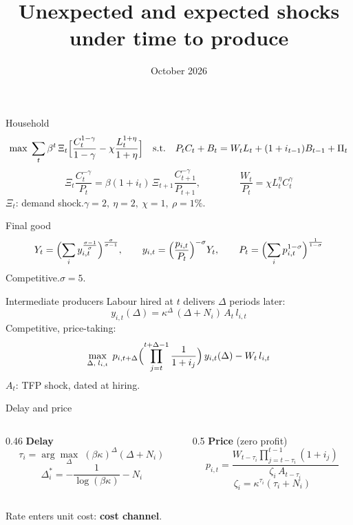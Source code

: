 \documentclass[aspectratio=169,11pt]{beamer}
\title{Unexpected and expected shocks\\[0.2em]under time to produce}
\date{October 2026}
\newcommand{\hl}[1]{{\color{mblue}\textbf{#1}}}
\begin{document}
\begin{frame}[plain]
  \vspace{2.2em}
  \titlepage
\end{frame}

\begin{frame}{Household}
  \[
    \max\;\sum_{t}\beta^t\,\Xi_t\Bigl[\frac{C_t^{1-\gamma}}{1-\gamma}
      -\chi\frac{L_t^{1+\eta}}{1+\eta}\Bigr]
    \quad\text{s.t.}\quad
    P_tC_t+B_t=W_tL_t+(1+i_{t-1})B_{t-1}+\Pi_t
  \]
  \[
    \Xi_t\frac{C_t^{-\gamma}}{P_t}=\beta(1+i_t)\,\Xi_{t+1}\frac{C_{t+1}^{-\gamma}}{P_{t+1}},
    \qquad\qquad
    \frac{W_t}{P_t}=\chi L_t^{\eta}C_t^{\gamma}
  \]
  \medskip
  $\Xi_t$: demand shock.\quad $\gamma=2,\ \eta=2,\ \chi=1,\ \rho=1\%$.
\end{frame}

\begin{frame}{Final good}
  \[
    Y_t=\Bigl(\sum_i y_{i,t}^{\frac{\sigma-1}{\sigma}}\Bigr)^{\frac{\sigma}{\sigma-1}},
    \qquad
    y_{i,t}=\Bigl(\frac{p_{i,t}}{P_t}\Bigr)^{-\sigma}Y_t,
    \qquad
    P_t=\Bigl(\sum_i p_{i,t}^{1-\sigma}\Bigr)^{\frac{1}{1-\sigma}}
  \]
  \medskip
  Competitive.\quad $\sigma=5$.
\end{frame}

\begin{frame}{Intermediate producers}
  Labour hired at $t$ delivers $\Delta$ periods later:
  \[
    y_{i,t}(\Delta)=\kappa^{\Delta}\,(\Delta+N_i)\,A_t\,l_{i,t}
  \]
  Competitive, price-taking:
  \[
    \max_{\Delta,\;l_{i,t}}\;
    p_{i,t+\Delta}\Bigl(\prod_{j=t}^{t+\Delta-1}\frac{1}{1+i_j}\Bigr)\,y_{i,t}(\Delta)-W_t\,l_{i,t}
  \]
  $A_t$: TFP shock, dated at hiring.
\end{frame}

\begin{frame}{Delay and price}
  \begin{columns}[T,onlytextwidth]
    \begin{column}{0.46\textwidth}
      \textbf{Delay}
      \[
        \tau_i=\arg\max_{\Delta}\;(\beta\kappa)^{\Delta}(\Delta+N_i)
      \]
      \[
        \Delta_i^{*}=-\frac{1}{\log(\beta\kappa)}-N_i
      \]
    \end{column}
    \begin{column}{0.5\textwidth}
      \textbf{Price} (zero profit)
      \[
        p_{i,t}=\frac{W_{t-\tau_i}\prod_{j=t-\tau_i}^{t-1}(1+i_j)}{\zeta_i\,A_{t-\tau_i}}
      \]
      \[
        \zeta_i=\kappa^{\tau_i}(\tau_i+N_i)
      \]
    \end{column}
  \end{columns}
  \bigskip
  Rate enters unit cost: \hl{cost channel}.
\end{frame}
\end{document}
